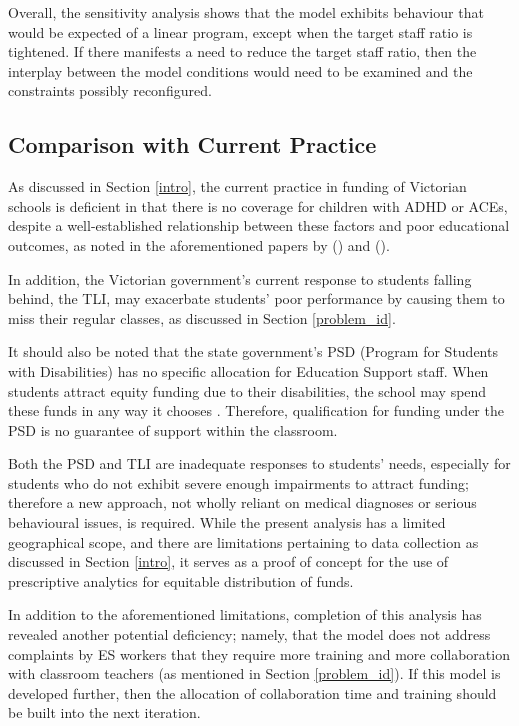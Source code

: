 \documentclass[11pt, a4paper]{article}
\begin{document}
    Overall, the sensitivity analysis shows that the model exhibits behaviour that would be expected of a linear program, except when the target staff ratio is tightened. If there manifests a need to reduce the target staff ratio, then the interplay between the model conditions would need to be examined and the constraints possibly reconfigured.

    \subsection{Comparison with Current Practice}

    As discussed in Section \ref{intro}, the current practice in funding of Victorian schools is deficient in that there is no coverage for children with ADHD or ACEs, despite a well-established relationship between these factors and poor educational outcomes, as noted in the aforementioned papers by  () and  (). 
    
    In addition, the Victorian government's current response to students falling behind, the TLI, may exacerbate students' poor performance by causing them to miss their regular classes, as discussed in Section \ref{problem_id}.

    It should also be noted that the state government's PSD (Program for Students with Disabilities) has no specific allocation for Education Support staff. When students attract equity funding due to their disabilities, the school may spend these funds in any way it chooses \parencite{srp_vic}. Therefore, qualification for funding under the PSD is no guarantee of support within the classroom. 

    Both the PSD and TLI are inadequate responses to students' needs, especially for students who do not exhibit severe enough impairments to attract funding; therefore a new approach, not wholly reliant on medical diagnoses or serious behavioural issues, is required. While the present analysis has a limited geographical scope, and there are limitations pertaining to data collection as discussed in Section \ref{intro}, it serves as a proof of concept for the use of prescriptive analytics for equitable distribution of funds.

    In addition to the aforementioned limitations, completion of this analysis has revealed another potential deficiency; namely, that the model does not address complaints by ES workers that they require more training and more collaboration with classroom teachers (as mentioned in Section \ref{problem_id}). If this model is developed further, then the allocation of collaboration time and training should be built into the next iteration. 
\end{document}
